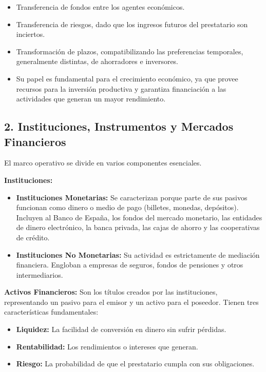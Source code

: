 \begin{itemize}
  \item Transferencia de fondos entre los agentes económicos.
  \item Transferencia de riesgos, dado que los ingresos futuros del prestatario son inciertos.
  \item Transformación de plazos, compatibilizando las preferencias temporales, generalmente distintas, de ahorradores e inversores.
  \item Su papel es fundamental para el crecimiento económico, ya que provee recursos para la inversión productiva y garantiza financiación a las actividades que generan un mayor rendimiento.
\end{itemize}

\subsection*{2. Instituciones, Instrumentos y Mercados Financieros}

El marco operativo se divide en varios componentes esenciales.

\textbf{Instituciones:}
\begin{itemize}
  \item \textbf{Instituciones Monetarias:} Se caracterizan porque parte de sus pasivos funcionan como dinero o medio de pago (billetes, monedas, depósitos). Incluyen al Banco de España, los fondos del mercado monetario, las entidades de dinero electrónico, la banca privada, las cajas de ahorro y las cooperativas de crédito.
  \item \textbf{Instituciones No Monetarias:} Su actividad es estrictamente de mediación financiera. Engloban a empresas de seguros, fondos de pensiones y otros intermediarios.
\end{itemize}

\textbf{Activos Financieros:}
Son los títulos creados por las instituciones, representando un pasivo para el emisor y un activo para el poseedor. Tienen tres características fundamentales:
\begin{itemize}
  \item \textbf{Liquidez:} La facilidad de conversión en dinero sin sufrir pérdidas.
  \item \textbf{Rentabilidad:} Los rendimientos o intereses que generan.
  \item \textbf{Riesgo:} La probabilidad de que el prestatario cumpla con sus obligaciones.
\end{itemize}

